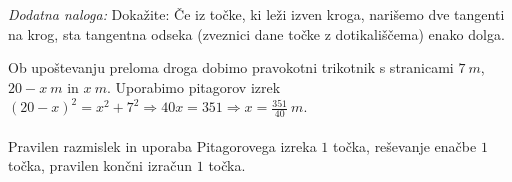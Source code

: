 \documentclass[addpoints]{exam}
\begin{document}
\begin{questions}

    \bonusquestion[3]
    \textit{Dodatna naloga:} Dokažite: Če iz točke, ki leži izven kroga, narišemo dve tangenti na krog, 
    sta tangentna odseka (zveznici dane točke z dotikališčema) enako dolga.

    \begin{solution}[1cm]
        Ob upoštevanju preloma droga dobimo pravokotni trikotnik s stranicami $7~m$, $20-x~m$ in $x~m$.
        Uporabimo pitagorov izrek $(20-x)^2=x^2+7^2 \Rightarrow 40x=351 \Rightarrow x=\frac{351}{40}~m$. \\ \\
        Pravilen razmislek in uporaba Pitagorovega izreka $1$ točka, reševanje enačbe $1$ točka, pravilen končni izračun $1$ točka.
    \end{solution}


\end{questions}
\end{document}
